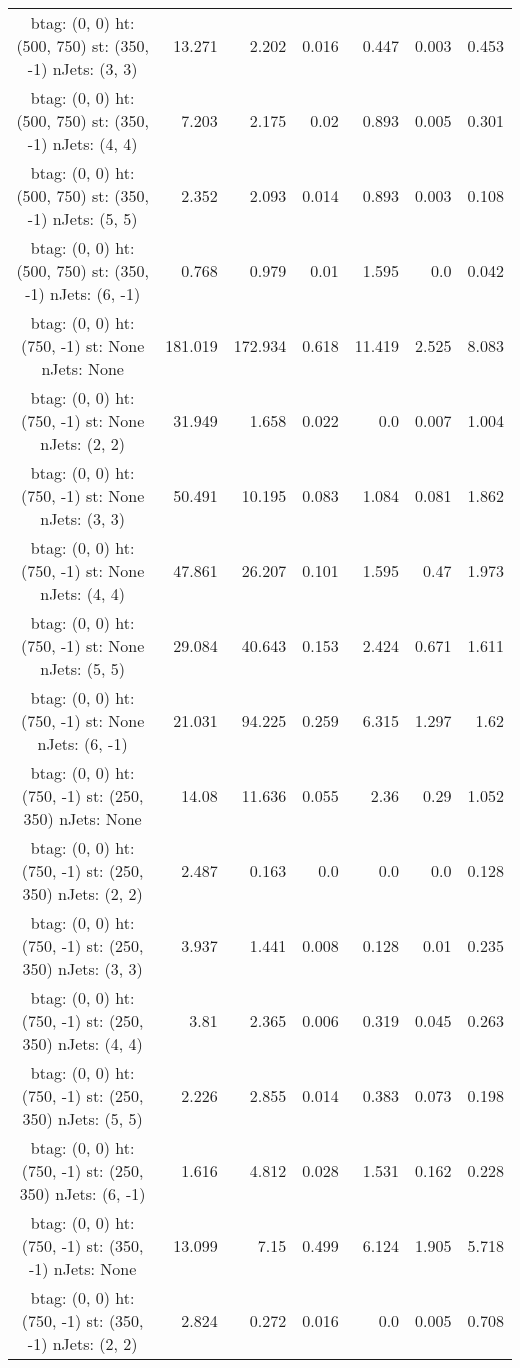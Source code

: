 \documentclass[12pt]{paper}
\begin{document}
\begin{landscape}
\begin{longtable}{c|r|r|r|r|r|r}
btag:  (0, 0) ht:  (500, 750) st:  (350, -1) nJets:  (3, 3)
 & 13.271 & 2.202 & 0.016 & 0.447 & 0.003 & 0.453\\
btag:  (0, 0) ht:  (500, 750) st:  (350, -1) nJets:  (4, 4)
 & 7.203 & 2.175 & 0.02 & 0.893 & 0.005 & 0.301\\
btag:  (0, 0) ht:  (500, 750) st:  (350, -1) nJets:  (5, 5)
 & 2.352 & 2.093 & 0.014 & 0.893 & 0.003 & 0.108\\
btag:  (0, 0) ht:  (500, 750) st:  (350, -1) nJets:  (6, -1)
 & 0.768 & 0.979 & 0.01 & 1.595 & 0.0 & 0.042\\
btag:  (0, 0) ht:  (750, -1) st:  None nJets:  None
 & 181.019 & 172.934 & 0.618 & 11.419 & 2.525 & 8.083\\
btag:  (0, 0) ht:  (750, -1) st:  None nJets:  (2, 2)
 & 31.949 & 1.658 & 0.022 & 0.0 & 0.007 & 1.004\\
btag:  (0, 0) ht:  (750, -1) st:  None nJets:  (3, 3)
 & 50.491 & 10.195 & 0.083 & 1.084 & 0.081 & 1.862\\
btag:  (0, 0) ht:  (750, -1) st:  None nJets:  (4, 4)
 & 47.861 & 26.207 & 0.101 & 1.595 & 0.47 & 1.973\\
btag:  (0, 0) ht:  (750, -1) st:  None nJets:  (5, 5)
 & 29.084 & 40.643 & 0.153 & 2.424 & 0.671 & 1.611\\
btag:  (0, 0) ht:  (750, -1) st:  None nJets:  (6, -1)
 & 21.031 & 94.225 & 0.259 & 6.315 & 1.297 & 1.62\\
btag:  (0, 0) ht:  (750, -1) st:  (250, 350) nJets:  None
 & 14.08 & 11.636 & 0.055 & 2.36 & 0.29 & 1.052\\
btag:  (0, 0) ht:  (750, -1) st:  (250, 350) nJets:  (2, 2)
 & 2.487 & 0.163 & 0.0 & 0.0 & 0.0 & 0.128\\
btag:  (0, 0) ht:  (750, -1) st:  (250, 350) nJets:  (3, 3)
 & 3.937 & 1.441 & 0.008 & 0.128 & 0.01 & 0.235\\
btag:  (0, 0) ht:  (750, -1) st:  (250, 350) nJets:  (4, 4)
 & 3.81 & 2.365 & 0.006 & 0.319 & 0.045 & 0.263\\
btag:  (0, 0) ht:  (750, -1) st:  (250, 350) nJets:  (5, 5)
 & 2.226 & 2.855 & 0.014 & 0.383 & 0.073 & 0.198\\
btag:  (0, 0) ht:  (750, -1) st:  (250, 350) nJets:  (6, -1)
 & 1.616 & 4.812 & 0.028 & 1.531 & 0.162 & 0.228\\
btag:  (0, 0) ht:  (750, -1) st:  (350, -1) nJets:  None
 & 13.099 & 7.15 & 0.499 & 6.124 & 1.905 & 5.718\\
btag:  (0, 0) ht:  (750, -1) st:  (350, -1) nJets:  (2, 2)
 & 2.824 & 0.272 & 0.016 & 0.0 & 0.005 & 0.708\\

\end{longtable}
\end{landscape}
\end{document}
